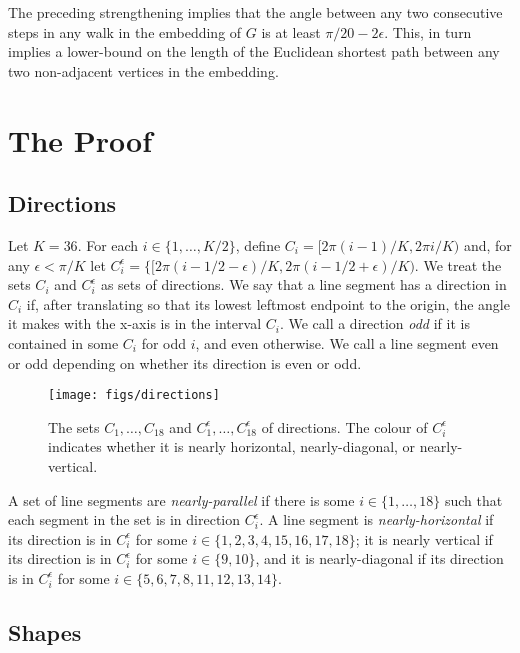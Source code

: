 \documentclass{patmorin}
\begin{document}
The preceding strengthening implies that the angle between any two
consecutive steps in any walk in the embedding of $G$ is at least
$\pi/20-2\epsilon$.  This, in turn implies a lower-bound on the length
of the Euclidean shortest path between any two non-adjacent vertices in
the embedding.

\section{The Proof}

\subsection{Directions}

Let $K=36$.  For each $i\in\{1,\ldots,K/2\}$, define $C_i=[2\pi
(i-1)/K,2\pi i/K)$ and, for any $\epsilon < \pi/K$ let $C_i^\epsilon
= \{[2\pi (i-1/2-\epsilon)/K,2\pi(i-1/2+\epsilon)/K)$.  We treat the
sets $C_i$ and $C_i^\epsilon$ as sets of directions. We say that a line
segment has a direction in $C_i$ if, after translating so that its lowest
leftmost endpoint to the origin, the angle it makes with the x-axis is in
the interval $C_i$.  We call a direction \emph{odd} if it is contained
in some $C_i$ for odd $i$, and even otherwise.  We call a line segment
even or odd depending on whether its direction is even or odd.

\begin{figure}
  \begin{center}
     \texttt{[image: figs/directions]}
  \end{center}
  \caption{The sets $C_1,\ldots,C_{18}$ and $C_1^{\epsilon},\ldots,C_{18}^\epsilon$ of directions.  The colour of $C_i^\epsilon$ indicates whether it is nearly horizontal, nearly-diagonal, or nearly-vertical.}
\end{figure}

A set of line segments are \emph{nearly-parallel} if there is some
$i\in\{1,\ldots,18\}$ such that each segment in the set is in direction
$C_i^{\epsilon}$.  A line segment is \emph{nearly-horizontal} if its
direction is in $C_i^\epsilon$ for some $i\in\{1,2,3,4,15,16,17,18\}$;
it is nearly vertical if its direction is in $C_i^\epsilon$ for some
$i\in\{9,10\}$, and it is nearly-diagonal if its direction is in
$C_i^\epsilon$ for some $i\in\{5,6,7,8,11,12,13,14\}$.

\subsection{Shapes}
\end{document}

